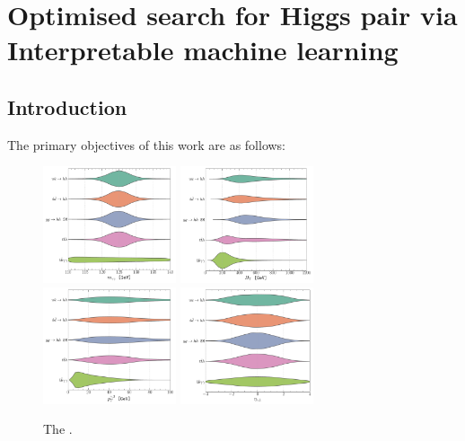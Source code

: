 
\chapter{ Optimised search for Higgs pair via Interpretable machine learning }\label{chap:MLLightYuk}
\section{Introduction}
\label{sec:Intro}


The primary objectives of this work are as follows:
\begin{figure}[t]
	\centering
	\includegraphics[width=0.35\textwidth]{fig/shape-MAA} 	\hspace*{0.25 cm}
	\includegraphics[width=0.35\textwidth]{fig/shape-HT}  \\
		\includegraphics[width=0.35\textwidth]{fig/shape-PTA2} \hspace*{0.25 cm}
		\includegraphics[width=0.35\textwidth]{fig/shape-ETAa1} 
	\caption{The . }
	\label{fig:voilen}
\end{figure}  

